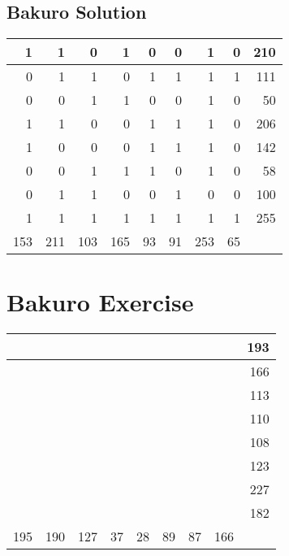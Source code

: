 \documentclass[]{article}
\begin{document}
 \subsection{Bakuro Solution} 
\begin{tabular}{rrrrrrrrr}
\hline
   1 &   1 &   0 &   1 &  0 &  0 &   1 &  0 & 210 \\ \hline
   0 &   1 &   1 &   0 &  1 &  1 &   1 &  1 & 111 \\ \hline
   0 &   0 &   1 &   1 &  0 &  0 &   1 &  0 &  50 \\ \hline
   1 &   1 &   0 &   0 &  1 &  1 &   1 &  0 & 206 \\ \hline
   1 &   0 &   0 &   0 &  1 &  1 &   1 &  0 & 142 \\ \hline
   0 &   0 &   1 &   1 &  1 &  0 &   1 &  0 &  58 \\ \hline
   0 &   1 &   1 &   0 &  0 &  1 &   0 &  0 & 100 \\ \hline
   1 &   1 &   1 &   1 &  1 &  1 &   1 &  1 & 255 \\ \hline
 153 & 211 & 103 & 165 & 93 & 91 & 253 & 65 &     \\ \hline
\hline
\end{tabular}\newpage\section{Bakuro Exercise}\begin{tabular}{rrrrrrrrr}
\hline
     &     &     &    &    &    &    &     & 193 \\ \hline
     &     &     &    &    &    &    &     & 166 \\ \hline
     &     &     &    &    &    &    &     & 113 \\ \hline
     &     &     &    &    &    &    &     & 110 \\ \hline
     &     &     &    &    &    &    &     & 108 \\ \hline
     &     &     &    &    &    &    &     & 123 \\ \hline
     &     &     &    &    &    &    &     & 227 \\ \hline
     &     &     &    &    &    &    &     & 182 \\ \hline
 195 & 190 & 127 & 37 & 28 & 89 & 87 & 166 &     \\ \hline
\hline
\end{tabular}\newpage 
\end{document}

